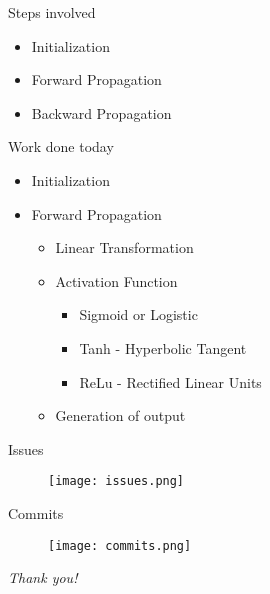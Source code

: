 \documentclass{beamer}
\begin{document}
\begin{frame}{Steps involved}
    \begin{itemize}
        \item Initialization
        \item Forward Propagation
        \item Backward Propagation
    \end{itemize}
\end{frame}
    
\begin{frame}{Work done today}
    \begin{itemize}
        \item Initialization
        \item Forward Propagation
        \pause
            \begin{itemize}
                \item Linear Transformation
                \pause
                \item Activation Function
                \pause
                    \begin{itemize}
                        \item Sigmoid or Logistic
                        \item Tanh - Hyperbolic Tangent
                        \item ReLu - Rectified Linear Units
                    \end{itemize}
                \pause
                \item Generation of output
            \end{itemize}
    \end{itemize}
\end{frame}

\begin{frame}{Issues}
    \begin{figure}
        \centering
        \texttt{[image: issues.png]}
    \end{figure}
\end{frame}
    
\begin{frame}{Commits}
    \begin{figure}
        \centering
        \texttt{[image: commits.png]}
    \end{figure}
\end{frame}

\begin{frame}{}
  \centering \Large
  \color{blue}
  \emph{Thank you!}
\end{frame}
\end{document}
